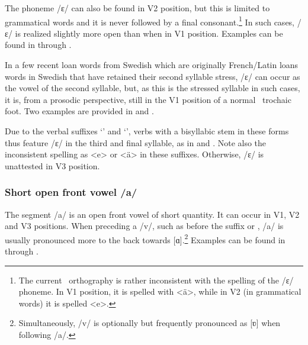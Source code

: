 The phoneme /ɛ/ can also be found in V2 position, but this is limited to grammatical words and it is never followed by a final consonant.\footnote{The current \PS\ orthography is rather inconsistent with the spelling of the /ɛ/ phoneme. In V1 position, it is spelled with <ä>, while in V2 (in grammatical words) it is spelled <e>.} %
In such cases, /ɛ/ is realized slightly more open than when in V1 position. Examples can be found in  through .

In a few recent loan words from Swedish which are originally French/Latin loans words in Swedish that have retained their second syllable stress, /ɛ/ can occur as the vowel of the second syllable, but, as this is the stressed syllable in such cases, it is, from a prosodic perspective, still in the V1 position of a normal \PS\ trochaic foot. Two examples are provided in  and .

Due to the verbal suffixes  ‘’ and  ‘’, verbs with a bisyllabic stem in these forms thus feature /ɛ/ in the third and final syllable, as in  and . Note also the inconsistent spelling as <e> or <ä> in these suffixes. 
Otherwise, /ɛ/ is unattested in V3 position.



\subsubsection{Short open front vowel /a/}
The segment /a/ is an open front vowel of short quantity. It can occur in V1, V2 and V3 positions. When preceding a /v/, such as before the suffix   or  , /a/ is usually pronounced more to the back towards [ɑ].\footnote{Simultaneously, /v/ is optionally but frequently pronounced as [ʋ] when following /a/.} Examples can be found in  through .


